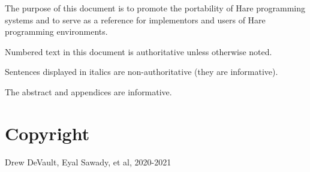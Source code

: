 
\specitem
The purpose of this document is to promote the portability of Hare programming
systems and to serve as a reference for implementors and users of Hare
programming environments.

\specitem
Numbered text in this document is authoritative unless otherwise noted.

\specitem
Sentences displayed in italics are non-authoritative (they are informative).


\specitem
The abstract and appendices are informative.

\section{Copyright}

\textcopyright Drew DeVault, Eyal Sawady, et al, 2020-2021

